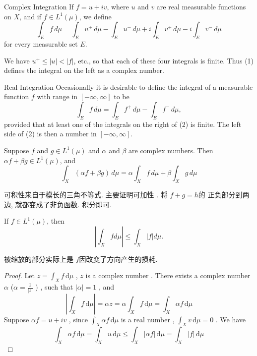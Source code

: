 \documentclass[../main.tex]{subfiles}
\begin{document}
\begin{definition}{Complex Integration}{}
If $f = u + iv$, where $u$ and $v$ are real measurable functions on $X$, and if $f \in L^1(\mu)$, we define
\[
\int_{E} f \,d\mu = \int_{E} u^{+} \,d\mu - \int_{E} u^{-} \,d\mu + i \int_{E} v^{+} \,d\mu - i \int_{E} v^{-} \,d\mu \tag{1}
\]
for every measurable set $E$.
\end{definition}
\begin{remark}
 We have $u^+ \le |u| < |f|$, etc., so that each of these four integrals is finite. Thus (1) defines the integral on the left as a complex number.
\end{remark}

\begin{definition}{Real Integration}{}
Occasionally it is desirable to define the integral of a measurable function $f$ with range in $[-\infty, \infty]$ to be
\[
\int_E f \,d\mu = \int_E f^+ \,d\mu - \int_E f^- \,d\mu, \tag{2}
\]
provided that at least one of the integrals on the right of (2) is finite. The left side of (2) is then a number in $[-\infty, \infty]$.
\end{definition}


\begin{theorem}{}{}
Suppose $f$ and $g \in L^1(\mu)$ and $\alpha$ and $\beta$ are complex numbers. Then $\alpha f + \beta g \in L^1(\mu)$, and
\[
\int_{X} (\alpha f + \beta g) \,d\mu = \alpha \int_{X} f \,d\mu + \beta \int_{X} g \,d\mu
\]
\end{theorem}
\begin{proofsketch}
    可积性来自于模长的三角不等式. 主要证明可加性 . 将 \(  f+ g = h  \)的 正负部分到两边, 就都变成了非负函数. 积分即可. 
\end{proofsketch}
\begin{theorem}{}{}
If $f \in L^1(\mu)$, then
\[
\left| \int_X f d\mu \right| \le \int_X |f| d\mu.
\]
\end{theorem}
\begin{note}
    被缩放的部分实际上是 \(  f  \)因改变了方向产生的损耗.  
\end{note}
\begin{proof}
    Let \(  z =  \int_{X} f\,\mathrm{d} \mu   \) , \(  z  \) is a complex number .  There exists a complex number \(  \alpha   \) (\(  \alpha = \frac{\bar{z} }{\left| z \right|  }   \) ) , such that \(  \left| \alpha  \right|= 1   \) , and   \[
    \left| \int_{X} f\,\mathrm{d} \mu  \right|=  \alpha z= \alpha \int_{X}f\,\mathrm{d} \mu  = \int_{X} \alpha f \,\mathrm{d} \mu 
    \]   Suppose \(  \alpha f= u+ iv  \) ,  since \(  \int_{X}\alpha f\,\mathrm{d} \mu   \) is a real number , \(  \int_{X}v\,\mathrm{d} \mu = 0  \) . We have \[
    \int_{X}\alpha f\,\mathrm{d} \mu = \int_{X}u\,\mathrm{d} \mu \le \int_{X}\left| \alpha f \right|\,\mathrm{d} \mu = \int_{X}\left| f \right|\,\mathrm{d} \mu   
    \]   
\end{proof}
\end{document}
